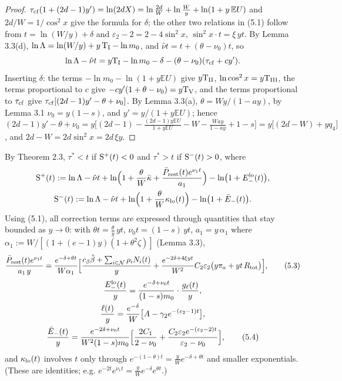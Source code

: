 \documentclass[11pt,a4paper]{article}
\theoremstyle{definition}
\theoremstyle{remark}
\begin{document}
\begin{proof}
$\tau_{\rm cf}(1+(2d-1)y')=\ln(2dX)=\ln\frac{2d}{W}+\ln\frac Wy+\ln(1+y\,\mathbb EU)$ and $2d/W=1/\cos^2x$ give the formula for $\delta$; the other two relations in (5.1) follow from $t=\ln(W/y)+\delta$ and $\varepsilon_2-2=2-4\sin^2x$, $\sin^2x\cdot t=\xi\,yt$. By Lemma 3.3(d), $\ln\Lambda=\ln(W/y)+y\,{\rm T_I}-\ln m_0$, and $\hat\nu t=t+(\theta-\nu_0)t$, so
\begin{equation*}
\ln\Lambda-\hat\nu t=y{\rm T_I}-\ln m_0-\delta-(\theta-\nu_0)(\tau_{\rm cf}+cy').
\end{equation*}
Inserting $\delta$: the terms $-\ln m_0-\ln(1+y\mathbb EU)$ give $y{\rm T_{II}}$, $\ln\cos^2x=y{\rm T_{III}}$, the terms proportional to $c$ give $-cy'(1+\theta-\nu_0)=y{\rm T_V}$, and the terms proportional to $\tau_{\rm cf}$ give $\tau_{\rm cf}[(2d-1)y'-\theta+\nu_0]$. By Lemma 3.3(a), $\theta=Wy/(1-ay)$, by Lemma 3.1 $\nu_0=y(1-s)$, and $y'=y/(1+y\mathbb EU)$; hence $(2d-1)y'-\theta+\nu_0=y\bigl[(2d-1)-\frac{(2d-1)y\mathbb EU}{1+y\mathbb EU}-W-\frac{Way}{1-ay}+1-s\bigr]=y\bigl[(2d-W)+yq_4\bigr]$, and $2d-W=2d\sin^2x=2d\,\xi y$.
\end{proof}

By Theorem 2.3, $\tau^*<t$ if ${\rm S}^+(t)<0$ and $\tau^*>t$ if ${\rm S}^-(t)>0$, where
\begin{gather*}
{\rm S}^+(t):=\ln\Lambda-\hat\nu t+\ln\Bigl(1+\frac\theta W\bar\kappa+\frac{\bar P_{\rm rest}(t)e^{\nu_1t}}{a_1}\Bigr)-\ln\bigl(1+E_-^{\rm lo}(t)\bigr), \\
{\rm S}^-(t):=\ln\Lambda-\hat\nu t+\ln\Bigl(1+\frac\theta W\kappa_{\rm lo}(t)\Bigr)-\ln\bigl(1+\bar E_-(t)\bigr).
\end{gather*}
Using (5.1), all correction terms are expressed through quantities that stay bounded as $y\to0$: with $\theta t=\frac\theta y\,yt$, $\nu_0t=(1-s)\,yt$, $a_1=y\,\alpha_1$ where $\alpha_1:=W/[(1+(e-1)y)(1+\theta^2\zeta)]$ (Lemma 3.3),
\begin{equation*}
\frac{\bar P_{\rm rest}(t)e^{\nu_1t}}{a_1\,y}=\frac{e^{-\delta+\theta t}}{W\alpha_1}\Bigl[\frac{c_\beta\hat\beta+\sum_{i\in\mathcal N}\rho_iN_i(t)}{y}+\frac{e^{-2\delta+4\xi yt}}{W^2}C_2\varepsilon_2\bigl(y\pi_a+yt\,R_{\rm tot}\bigr)\Bigr], \tag{5.3}
\end{equation*}
\begin{gather*}
\frac{E_-^{\rm lo}(t)}{y}=\frac{e^{-\delta+\nu_0t}}{(1-s)m_0}\cdot\frac{g_\ell(t)}{y}, \\
\frac{\ell(t)}{y}=\frac{e^{-\delta}}{W}\bigl[A-\gamma_2e^{-(\varepsilon_2-1)t}\bigr], \\
\frac{\bar E_-(t)}{y}=\frac{e^{-2\delta+\nu_0t}}{W^2(1-s)m_0}\Bigl[\frac{2C_1}{2-\nu_0}+\frac{C_2\varepsilon_2e^{-(\varepsilon_2-2)t}}{\varepsilon_2-\nu_0}\Bigr], \tag{5.4}
\end{gather*}
and $\kappa_{\rm lo}(t)$ involves $t$ only through $e^{-(1-\theta)t}=\frac yWe^{-\delta+\theta t}$ and smaller exponentials. (These are identities; e.g. $e^{-2t}e^{\nu_1t}=\frac yWe^{-\delta}e^{\theta t}$.)
\end{document}
